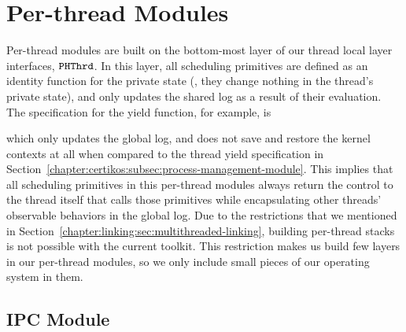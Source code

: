 \section{Per-thread Modules}
\label{chapter:certikos:sec:per-thread-modules}

Per-thread modules are built on
the bottom-most layer of our thread local layer interfaces, ${{\mathrm{\texttt{PHThrd}}}}$.
In this layer, all scheduling primitives are defined as an identity function for the private state (\ie, they change nothing in the thread's private state),
and only updates the shared log as a result of their evaluation. 
The specification for the  yield function, for example, is

which only updates the global log, and does not save and restore the kernel contexts at all when compared to the thread yield specification 
in Section~\ref{chapter:certikos:subsec:process-management-module}.
This implies that all scheduling primitives in this per-thread modules always return the control to the thread itself that calls those primitives while
encapsulating other threads' observable behaviors in the global log.
Due to the restrictions that we mentioned in Section~\ref{chapter:linking:sec:multithreaded-linking},
building per-thread stacks is not possible with the current toolkit. 
This restriction makes us build few layers in our per-thread modules,
so we only include small pieces of our operating system in them.


\subsection{IPC Module}
\label{chapter:certikos:subsec:ipc-module}


